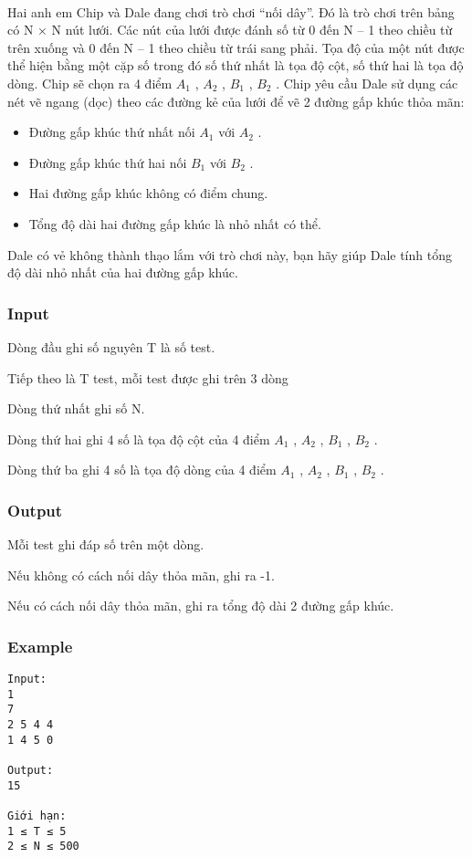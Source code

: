 

 

Hai anh em Chip và Dale đang chơi trò chơi “nối dây”. Đó là trò chơi trên bảng có N × N nút lưới. Các nút của lưới được đánh số từ 0 đến N – 1 theo chiều từ trên xuống và 0 đến N – 1 theo chiều từ trái sang phải. Tọa độ của một nút được thể hiện bằng một cặp số trong đó số thứ nhất là tọa độ cột, số thứ hai là tọa độ dòng. Chip sẽ chọn ra 4 điểm $A_{1}$ , $A_{2}$ , $B_{1}$ , $B_{2}$ . Chip yêu cầu Dale sử dụng các nét vẽ ngang (dọc) theo các đường kẻ của lưới để vẽ 2 đường gấp khúc thỏa mãn:
\begin{itemize}
	\item Đường gấp khúc thứ nhất nối $A_{1}$ với $A_{2}$ .
	\item Đường gấp khúc thứ hai nối $B_{1}$ với $B_{2}$ .
	\item Hai đường gấp khúc không có điểm chung.
	\item Tổng độ dài hai đường gấp khúc là nhỏ nhất có thể.
\end{itemize}

Dale có vẻ không thành thạo lắm với trò chơi này, bạn hãy giúp Dale tính tổng độ dài nhỏ nhất của hai đường gấp khúc.

\subsubsection{Input}

Dòng đầu ghi số nguyên T là số test.

Tiếp theo là T test, mỗi test được ghi trên 3 dòng

Dòng thứ nhất ghi số N.

Dòng thứ hai ghi 4 số là tọa độ cột của 4 điểm $A_{1}$ , $A_{2}$ , $B_{1}$ , $B_{2}$ .

Dòng thứ ba ghi 4 số là tọa độ dòng của 4 điểm $A_{1}$ , $A_{2}$ , $B_{1}$ , $B_{2}$ .

\subsubsection{Output}

Mỗi test ghi đáp số trên một dòng.

Nếu không có cách nối dây thỏa mãn, ghi ra -1.

Nếu có cách nối dây thỏa mãn, ghi ra tổng độ dài 2 đường gấp khúc.

\subsubsection{Example}
\begin{verbatim}
Input:
1
7
2 5 4 4
1 4 5 0

Output:
15

Giới hạn:
1 ≤ T ≤ 5 
2 ≤ N ≤ 500 
\end{verbatim}
